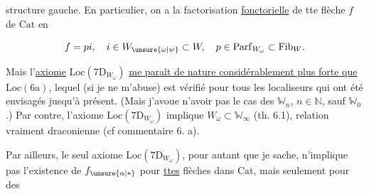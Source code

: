 structure gauche. En particulier, on a la factorisation \uline{fonctorielle} de tte flèche $f$ de $\mathrm{Cat}$ en

\[
 f=pi,\quad i\in W_{\unsure{\omega|w}}\subset W,\quad p\in\mathrm{Parf}_{W_\omega}\subset\mathrm{Fib}_W.
\]

Mais l'\uline{axiome} $\mathrm{Loc}(7\mathrm{D}_{W_\omega})$ \uline{me paraît de nature considérablement plus forte que} $\mathrm{Loc}(6\mathrm{a})$, lequel (si je ne m'abuse) est vérifié pour tous les localiseurs qui ont été envisagés jusqu'à présent. (Mais j'avoue n'avoir pas  le cas des $\mathbb{W}_n$, $n\in\mathbb{N}$, sauf $\mathbb{W}_0$.) Par contre, l'axiome  $\mathrm{Loc}(7\mathrm{D}_{W_\omega})$ implique $W_\omega\subset\mathbb{W}_\infty$ (th. 6.1), relation vraiment draconienne (cf commentaire 6. a).

Par ailleurs, le seul axiome $\mathrm{Loc}(7\mathrm{D}_{W_\omega})$, pour autant que je sache, n'implique pas l'existence de $f_{\unsure{\alpha|*}}$ pour \uline{ttes} flèches dans $\mathrm{Cat}$, mais seulement pour des
